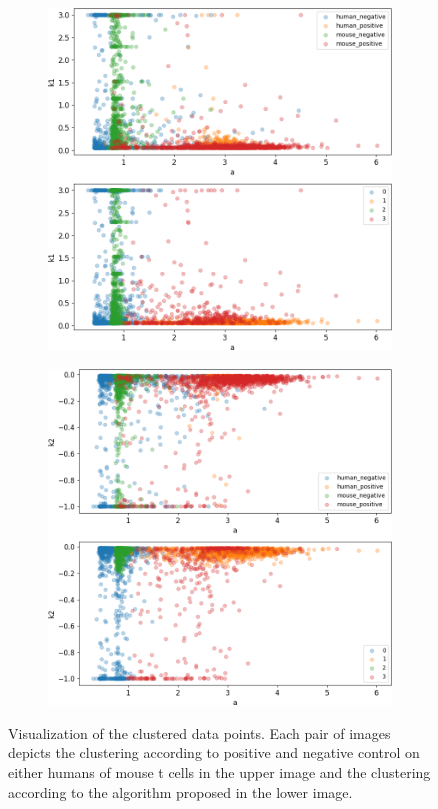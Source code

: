 \begin{figure}
\begin{subfigure}{0.49\textwidth}
	\end{subfigure}
	\hfill
	\begin{subfigure}{0.49\textwidth}
		\includegraphics[width=\textwidth]{fig/seperate_a_k1}
	\end{subfigure}
	\hfill
	\begin{subfigure}{0.49\textwidth}
		\includegraphics[width=\textwidth]{fig/seperate_a_k2}
	\end{subfigure}
	
	\caption{Visualization of the clustered data points. Each pair of images depicts the clustering according to positive and negative control on either humans of mouse t cells in the upper image and the clustering according to the algorithm proposed in the lower image.}
\label{fig:vis_output_seperate1}
\end{figure}
	
